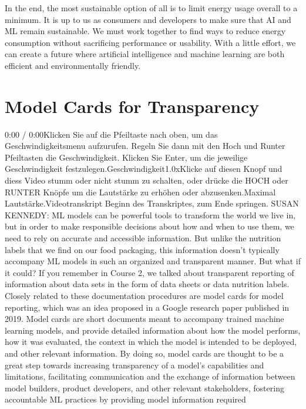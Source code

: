 {{{{{{{{    In the end, the most sustainable option of all is to limit energy usage overall to a minimum. It is up to us as consumers and developers to make sure that AI and ML remain sustainable. We must work together to find ways to reduce energy consumption without sacrificing performance or usability. With a little effort, we can create a future where artificial intelligence and machine learning are both efficient and environmentally friendly.    

\section{Model Cards for Transparency}

    0:00 / 0:00Klicken Sie auf die Pfeiltaste nach oben, um das Geschwindigkeitsmenu aufzurufen. Regeln Sie dann mit den Hoch und Runter Pfeiltasten die Geschwindigkeit. Klicken Sie Enter, um die jeweilige Geschwindigkeit festzulegen.Geschwindigkeit1.0xKlicke auf diesen Knopf und diess Video stumm oder nicht stumm zu schalten, oder drücke die HOCH oder RUNTER Knöpfe um die Lautstärke zu erhöhen oder abzusenken.Maximal Lautstärke.Videotranskript
    Beginn des Transkriptes, zum Ende springen.
    SUSAN KENNEDY: ML models can be powerful tools
    to transform the world we live in, but in order
    to make responsible decisions about how and when to use them,
    we need to rely on accurate and accessible information.
    But unlike the nutrition labels that we find on our food packaging,
    this information doesn't typically accompany ML models
    in such an organized and transparent manner.
    But what if it could?
    If you remember in Course 2, we talked about transparent reporting
    of information about data sets in the form of data sheets or data nutrition
    labels.
    Closely related to these documentation procedures
    are model cards for model reporting, which
    was an idea proposed in a Google research paper published in 2019.
    Model cards are short documents meant to accompany trained machine learning
    models, and provide detailed information about how the model performs,
    how it was evaluated, the context in which
    the model is intended to be deployed, and other relevant information.
    By doing so, model cards are thought to be
    a great step towards increasing transparency of a model's capabilities
    and limitations, facilitating communication
    and the exchange of information between model builders, product
    developers, and other relevant stakeholders,
    fostering accountable ML practices by providing model information required
}}}}}}}}
